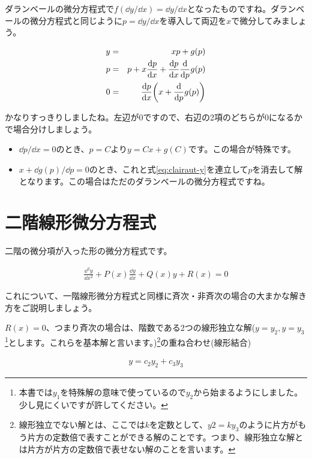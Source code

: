 \noindent
ダランベールの微分方程式で$f(\dd y/\dd x)=\dd y/\dd x$となったものですね。ダランベールの微分方程式と同じように$p=\dd y/\dd x$を導入して両辺を$x$で微分してみましょう。

\begin{eqnarray}
    \label{eq:clairaut-y}
    y&=&xp+g(p) \\
    p&=&p+x\frac{\dd p}{\dd x}+\frac{\dd p}{\dd x}\frac{\dd}{\dd p}g(p) \\
    0&=&\frac{\dd p}{\dd x}\pqty{x+\frac{\dd}{\dd p}g(p)}
\end{eqnarray}

\noindent
かなりすっきりしましたね。左辺が0ですので、右辺の2項のどちらが0になるかで場合分けしましょう。

\begin{itemize}
    \item $\dd p/\dd x=0$のとき、$p=C$より$y=Cx+g(C)$です。この場合が特殊です。
    \item $x+\dd g(p)/\dd p=0$のとき、これと式\ref{eq:clairaut-y}を連立して$p$を消去して解となります。この場合はただのダランベールの微分方程式ですね。
\end{itemize}










\section{二階線形微分方程式}
\label{second-order}
二階の微分項が入った形の微分方程式です。

\begin{eqnarray}
    \frac{\dd^2y}{\dd x^2}+P(x)\frac{\dd y}{\dd x}+Q(x)y+R(x)=0
\end{eqnarray}

これについて、一階線形微分方程式と同様に斉次・非斉次の場合の大まかな解き方をご説明しましょう。

$R(x)=0$、つまり斉次の場合は、階数である2つの線形独立な解($y=y_2,y=y_3$\footnote{本書では$y_1$を特殊解の意味で使っているので$y_2$から始まるようにしました。少し見にくいですが許してください。}とします。これらを基本解と言います。)\footnote{線形独立でない解とは、ここでは$k$を定数として、$y2=ky_3$のように片方がもう片方の定数倍で表すことができる解のことです。つまり、線形独立な解とは片方が片方の定数倍で表せない解のことを言います。}の重ね合わせ(線形結合)

\begin{eqnarray}
    y=c_2y_2+c_3y_3
\end{eqnarray}

